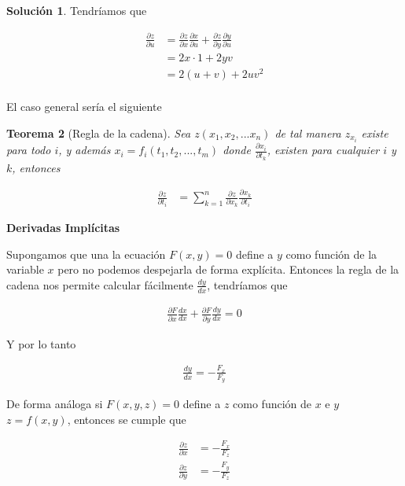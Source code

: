 \documentclass{article}
\theoremstyle{plain}
\newtheorem{thm}{Teorema}[section]
\theoremstyle{definition}
\newtheorem{sol}[thm]{Solución}
\begin{document}
\begin{sol}Tendríamos que
\end{sol}

\begin{align*}
\frac{\partial z}{\partial u} &= \frac{\partial z}{\partial x} \frac{\partial x}{\partial u} + \frac{\partial z}{\partial y} \frac{\partial y}{\partial u}  \\
&= 2x \cdot 1 + 2y v  \\
&= 2(u+v) + 2uv^2  \\
\end{align*}


El caso general sería el siguiente \\

\begin{thm}[Regla de la cadena]Sea $z(x_1,x_2,... x_n)$ de tal manera $z_{x_i}$ existe para todo $i$, y además $x_i=f_i(t_1,t_2,..., t_m)$ donde $\frac{\partial x_i}{\partial t_k}$, existen para cualquier $i$ y $k$, entonces
\end{thm}

\begin{align*}
    \frac{\partial z}{\partial t_i} &= \sum_{k=1}^n \frac{\partial z}{\partial x_k}\frac{\partial x_k}{\partial t_i}
\end{align*}

\newpage

\begin{center}
    \Large{\textbf{Derivadas Implícitas}}
\end{center}

Supongamos que una la ecuación $F(x,y) =0$ define a $y$ como función de la variable $x$ pero no podemos despejarla de forma explícita. Entonces la regla de la cadena nos permite calcular fácilmente $\displaystyle \frac{dy}{dx}$, tendríamos que

\begin{align*}
    \frac{\partial F}{\partial x} \frac{dx}{dx} + \frac{\partial F}{\partial y} \frac{dy}{dx} = 0
\end{align*}

Y por lo tanto

\begin{align*}
    \frac{dy}{dx} = - \frac{F_x}{F_y}
\end{align*}

De forma análoga si $F(x,y,z) =0$ define a $z$ como función de $x$ e $y$ $z=f(x,y)$, entonces se cumple que

\begin{align*}
    \frac{\partial z }{\partial x} &= - \frac{F_x}{F_z} \\
    \frac{\partial z }{\partial y} &= - \frac{F_y}{F_z} \\
\end{align*}
\end{document}
